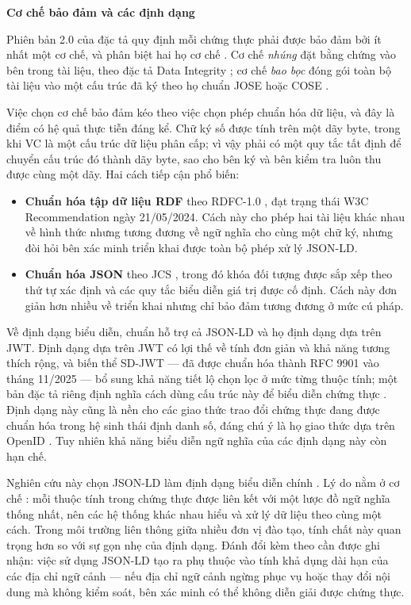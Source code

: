 \noindent \textbf{Cơ chế bảo đảm và các định dạng}

Phiên bản 2.0 của đặc tả quy định mỗi chứng thực phải được bảo đảm bởi ít nhất một cơ chế, và phân biệt hai họ cơ chế \cite{W3C_VCDM2025}. Cơ chế \emph{nhúng} đặt bằng chứng vào bên trong tài liệu, theo đặc tả Data Integrity \cite{W3C_VCDataIntegrity2025}; cơ chế \emph{bao bọc} đóng gói toàn bộ tài liệu vào một cấu trúc đã ký theo họ chuẩn JOSE hoặc COSE \cite{W3C_VCJOSECOSE2025}.

Việc chọn cơ chế bảo đảm kéo theo việc chọn phép chuẩn hóa dữ liệu, và đây là điểm có hệ quả thực tiễn đáng kể. Chữ ký số được tính trên một dãy byte, trong khi VC là một cấu trúc dữ liệu phân cấp; vì vậy phải có một quy tắc tất định để chuyển cấu trúc đó thành dãy byte, sao cho bên ký và bên kiểm tra luôn thu được cùng một dãy. Hai cách tiếp cận phổ biến:

\begin{itemize}
    \item \textbf{Chuẩn hóa tập dữ liệu RDF} theo RDFC-1.0 \cite{W3C_RDFC2024}, đạt trạng thái W3C Recommendation ngày 21/05/2024. Cách này cho phép hai tài liệu khác nhau về hình thức nhưng tương đương về ngữ nghĩa cho cùng một chữ ký, nhưng đòi hỏi bên xác minh triển khai được toàn bộ phép xử lý JSON-LD.
    \item \textbf{Chuẩn hóa JSON} theo JCS \cite{RFC8785}, trong đó khóa đối tượng được sắp xếp theo thứ tự xác định và các quy tắc biểu diễn giá trị được cố định. Cách này đơn giản hơn nhiều về triển khai nhưng chỉ bảo đảm tương đương ở mức cú pháp.
\end{itemize}

Về định dạng biểu diễn, chuẩn hỗ trợ cả JSON-LD và họ định dạng dựa trên JWT. Định dạng dựa trên JWT có lợi thế về tính đơn giản và khả năng tương thích rộng, và biến thể SD-JWT --- đã được chuẩn hóa thành RFC 9901 vào tháng 11/2025 \cite{RFC9901} --- bổ sung khả năng tiết lộ chọn lọc ở mức từng thuộc tính; một bản đặc tả riêng định nghĩa cách dùng cấu trúc này để biểu diễn chứng thực \cite{SDJWTVC2025}. Định dạng này cũng là nền cho các giao thức trao đổi chứng thực đang được chuẩn hóa trong hệ sinh thái định danh số, đáng chú ý là họ giao thức dựa trên OpenID \cite{OpenID4VP2025}. Tuy nhiên khả năng biểu diễn ngữ nghĩa của các định dạng này còn hạn chế.

Nghiên cứu này chọn JSON-LD làm định dạng biểu diễn chính \cite{W3C_JSONLD2020}. Lý do nằm ở cơ chế : mỗi thuộc tính trong chứng thực được liên kết với một lược đồ ngữ nghĩa thống nhất, nên các hệ thống khác nhau hiểu và xử lý dữ liệu theo cùng một cách. Trong môi trường liên thông giữa nhiều đơn vị đào tạo, tính chất này quan trọng hơn so với sự gọn nhẹ của định dạng. Đánh đổi kèm theo cần được ghi nhận: việc sử dụng JSON-LD tạo ra phụ thuộc vào tính khả dụng dài hạn của các địa chỉ ngữ cảnh --- nếu địa chỉ ngữ cảnh ngừng phục vụ hoặc thay đổi nội dung mà không kiểm soát, bên xác minh có thể không diễn giải được chứng thực.

